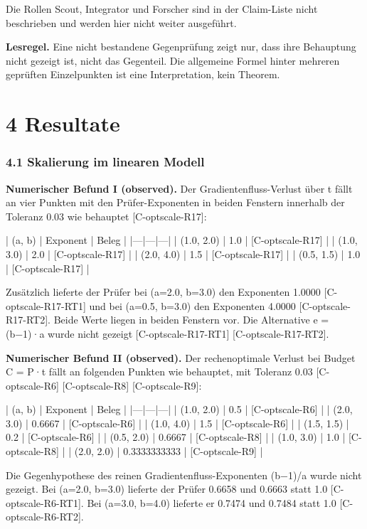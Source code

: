 \documentclass[10pt,twocolumn]{article}
\begin{document}
Die Rollen Scout, Integrator und Forscher sind in der Claim-Liste nicht beschrieben und werden hier nicht weiter ausgeführt.

\textbf{Lesregel.} Eine nicht bestandene Gegenprüfung zeigt nur, dass ihre Behauptung nicht gezeigt ist, nicht das Gegenteil. Die allgemeine Formel hinter mehreren geprüften Einzelpunkten ist eine Interpretation, kein Theorem.

\section{4 Resultate}

\subsubsection*{4.1 Skalierung im linearen Modell}

\textbf{Numerischer Befund I (observed).} Der Gradientenfluss-Verlust über t fällt an vier Punkten mit den Prüfer-Exponenten in beiden Fenstern innerhalb der Toleranz 0.03 wie behauptet {\scriptsize[C-optscale-R17]}:

| (a, b) | Exponent | Beleg |
|---|---|---|
| (1.0, 2.0) | 1.0 | {\scriptsize[C-optscale-R17]} |
| (1.0, 3.0) | 2.0 | {\scriptsize[C-optscale-R17]} |
| (2.0, 4.0) | 1.5 | {\scriptsize[C-optscale-R17]} |
| (0.5, 1.5) | 1.0 | {\scriptsize[C-optscale-R17]} |

Zusätzlich lieferte der Prüfer bei (a=2.0, b=3.0) den Exponenten 1.0000 {\scriptsize[C-optscale-R17-RT1]} und bei (a=0.5, b=3.0) den Exponenten 4.0000 {\scriptsize[C-optscale-R17-RT2]}. Beide Werte liegen in beiden Fenstern vor. Die Alternative e = (b−1)·a wurde nicht gezeigt {\scriptsize[C-optscale-R17-RT1]} {\scriptsize[C-optscale-R17-RT2]}.

\textbf{Numerischer Befund II (observed).} Der rechenoptimale Verlust bei Budget C = P·t fällt an folgenden Punkten wie behauptet, mit Toleranz 0.03 {\scriptsize[C-optscale-R6]} {\scriptsize[C-optscale-R8]} {\scriptsize[C-optscale-R9]}:

| (a, b) | Exponent | Beleg |
|---|---|---|
| (1.0, 2.0) | 0.5 | {\scriptsize[C-optscale-R6]} |
| (2.0, 3.0) | 0.6667 | {\scriptsize[C-optscale-R6]} |
| (1.0, 4.0) | 1.5 | {\scriptsize[C-optscale-R6]} |
| (1.5, 1.5) | 0.2 | {\scriptsize[C-optscale-R6]} |
| (0.5, 2.0) | 0.6667 | {\scriptsize[C-optscale-R8]} |
| (1.0, 3.0) | 1.0 | {\scriptsize[C-optscale-R8]} |
| (2.0, 2.0) | 0.3333333333 | {\scriptsize[C-optscale-R9]} |

Die Gegenhypothese des reinen Gradientenfluss-Exponenten (b−1)/a wurde nicht gezeigt. Bei (a=2.0, b=3.0) lieferte der Prüfer 0.6658 und 0.6663 statt 1.0 {\scriptsize[C-optscale-R6-RT1]}. Bei (a=3.0, b=4.0) lieferte er 0.7474 und 0.7484 statt 1.0 {\scriptsize[C-optscale-R6-RT2]}.
\end{document}
